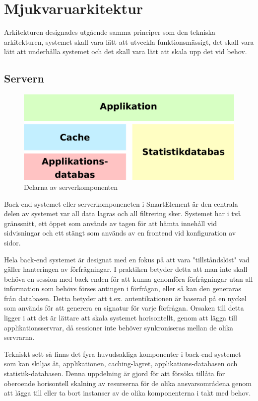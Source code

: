 \section{Mjukvaruarkitektur}

Arkitekturen designades utgående samma principer som den tekniska arkitekturen, systemet skall vara lätt att utveckla funktionsmässigt, det skall vara lätt att underhålla systemet och det skall vara lätt att skala upp det vid behov.

\subsection{Servern}

\begin{figure}[h!]
\centering
\includegraphics[width=120mm]{assets/images/smelementbackendparts.png}
\caption{Delarna av serverkomponenten}
\label{abstractbackend}
\end{figure}

Back-end systemet eller serverkomponeneten i SmartElement är den centrala delen av systemet var all data lagras och all filtrering sker. Systemet har i två gränssnitt, ett öppet som används av tagen för att hämta innehåll vid sidvisningar och ett stängt som används av en frontend vid konfiguration av sidor.

Hela back-end systemet är designat med en fokus på att vara "tillståndslöst" vad gäller hanteringen av förfrågningar. I praktiken betyder detta att man inte skall behöva en session med back-enden för att kunna genomföra förfrågningar utan all information som behövs förses antingen i förfrågan, eller så kan den generaras från databasen. Detta betyder att t.ex. autentikationen är baserad på en nyckel som används för att generera en signatur för varje förfrågan. Orsaken till detta ligger i att det är lättare att skala systemet horisontellt, genom att lägga till applikationsservrar, då sessioner inte behöver synkroniseras mellan de olika servrarna.

Tekniskt sett så finns det fyra huvudsakliga komponenter i back-end systemet som kan skiljas åt, applikationen, caching-lagret, applikations-databasen och statistik-databasen. Denna uppdelning är gjord för att försöka tillåta för oberoende horisontell skalning av resurserna för de olika ansvarsområdena genom att lägga till eller ta bort instanser av de olika komponenterna i takt med behov.


